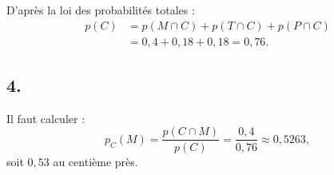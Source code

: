 \documentclass[10pt]{article}
\begin{document}
D'après la loi des probabilités totales :
\begin{align*}
p(C) &= p(M \cap C) + p(T \cap C) + p(P \cap C) \\
&= 0{,}4 + 0{,}18 + 0{,}18 = 0{,}76.
\end{align*}

\subsection*{4.}

Il faut calculer :
\[
p_C(M) = \dfrac{p(C \cap M)}{p(C)} = \dfrac{0{,}4}{0{,}76} \approx 0{,}5263,
\]
soit \(0{,}53\) au centième près.
\end{document}
